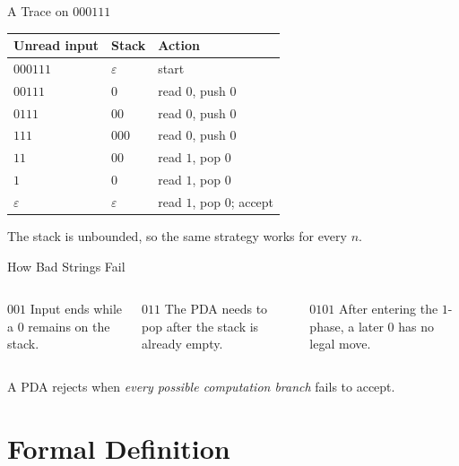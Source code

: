 \documentclass[aspectratio=169,10pt]{beamer}
\newcommand{\eps}{\varepsilon}
\begin{document}
\begin{frame}{A Trace on $000111$}
\centering
\renewcommand{\arraystretch}{1.25}
\begin{tabular}{lll}
\toprule
\textbf{Unread input} & \textbf{Stack} & \textbf{Action}\\
\midrule
$000111$ & $\eps$ & start\\
$00111$  & $0$    & read $0$, push $0$\\
$0111$   & $00$   & read $0$, push $0$\\
$111$    & $000$  & read $0$, push $0$\\
$11$     & $00$   & read $1$, pop $0$\\
$1$      & $0$    & read $1$, pop $0$\\
$\eps$   & $\eps$ & read $1$, pop $0$; accept\\
\bottomrule
\end{tabular}

\vspace{0.8em}
The stack is unbounded, so the same strategy works for every $n$.
\end{frame}

\begin{frame}{How Bad Strings Fail}
\begin{columns}[T,onlytextwidth]
\begin{alertblock}{$001$}
Input ends while a $0$ remains on the stack.
\end{alertblock}

\begin{alertblock}{$011$}
The PDA needs to pop after the stack is already empty.
\end{alertblock}

\begin{alertblock}{$0101$}
After entering the $1$-phase, a later $0$ has no legal move.
\end{alertblock}
\end{columns}

\vspace{1em}
A PDA rejects when \emph{every possible computation branch} fails to accept.
\end{frame}

\section{Formal Definition}
\end{document}
